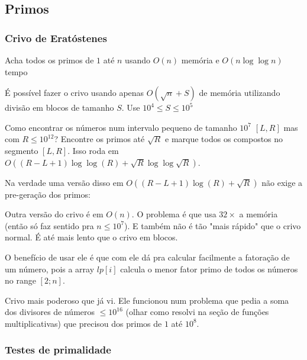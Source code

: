 \subsection{Primos}

\subsubsection{Crivo de Eratóstenes}

Acha todos os primos de $1$ até $n$ usando $O(n)$ memória e $O(n \log \log n)$ tempo


É possível fazer o crivo usando apenas $O(\sqrt{n}+S)$ de memória utilizando divisão em blocos de tamanho $S$. Use $10^4 \leq S \leq 10^5$


Como encontrar os números num intervalo pequeno de tamanho $10^7$ $[L, R]$ mas com $R \leq 10^{12}$? Encontre os primos até $\sqrt{R}$ e marque todos os compostos no segmento $[L, R]$. Isso roda em $O((R-L+1) \log \log(R) + \sqrt{R} \log \log \sqrt{R})$.


Na verdade uma versão disso em $O((R-L+1)\log(R) + \sqrt{R})$ não exige a pre-geração dos primos:


Outra versão do crivo é em $O(n)$. O problema é que usa $32 \times$ a memória (então só faz sentido pra $n \leq 10^7$). E também não é tão "mais rápido" que o crivo normal. É até mais lento que o crivo em blocos.

O benefício de usar ele é que com ele dá pra calcular facilmente a fatoração de um número, pois a array $lp[i]$ calcula o menor fator primo de todos os números no range $[2; n]$.


Crivo mais poderoso que já vi. Ele funcionou num problema que pedia a soma dos divisores de números $\leq 10^{16}$ (olhar como resolvi na seção de funções multiplicativas) que precisou dos primos de $1$ até $10^8$.


\subsubsection{Testes de primalidade}

